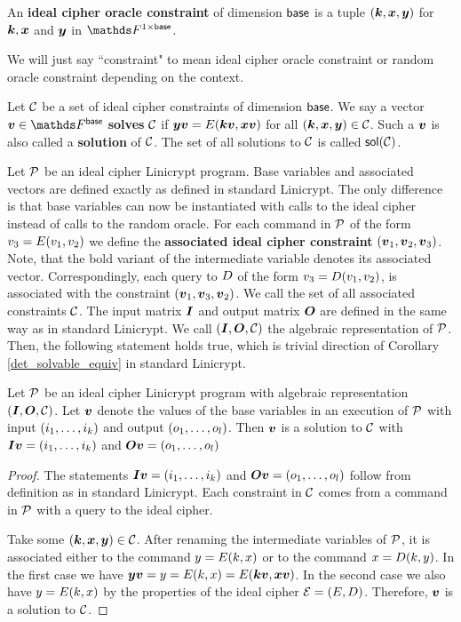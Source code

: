 \begin{defn}
An \textbf{ideal cipher oracle constraint} of dimension $\base$ is a tuple $(\vk, \vx, \vy)$ for
$\vk, \vx$ and $\vy$ in $\F^{1 \times \base}$.
\end{defn}

We will just say ``constraint" to mean ideal cipher oracle constraint or random oracle constraint depending on the context.

\begin{defn}
    Let $\C$ be a set of ideal cipher constraints of dimension $\base$.
    We say a vector $\vv \in \Base$ \textbf{solves} $\C$ if
    $\vy \vv = \E(\vk \vv, \vx \vv)$ for all $(\vk, \vx, \vy) \in \C$.
    Such a $\vv$ is also called a \textbf{solution} of $\C$.
    The set of all solutions to $\C$ is called $\sol(\C)$.
\end{defn}

Let $\P$ be an ideal cipher Linicrypt program.
Base variables and associated vectors are defined exactly as defined in standard Linicrypt.
The only difference is that base variables can now be instantiated with calls to the ideal cipher instead of calls to the random oracle.
For each command in $\P$ of the form $v_3 = \E(v_1,v_2)$
we define the \textbf{associated ideal cipher constraint} $(\vv_1, \vv_2, \vv_3)$.
Note, that the bold variant of the intermediate variable denotes its associated vector.
Correspondingly, each query to $\D$ of the form $v_3 = \D(v_1,v_2)$,
is associated with the constraint $(\vv_1, \vv_3, \vv_2)$.
We call the set of all associated constraints $\C$. 
The input matrix $\I$ and output matrix $\O$ are defined in the same way as in standard Linicrypt.
We call $(\I,\O,\C)$ the algebraic representation of $\P$.
Then, the following statement holds true, which is trivial direction of Corollary \ref{det_solvable_equiv} in standard Linicrypt.

\begin{lemma}
    Let $\P$ be an ideal cipher Linicrypt program with algebraic representation $(\I,\O,\C)$.
    Let $\vv$ denote the values of the base variables in an execution of $\P$ with input $(\dts i k)$ and output $(\dts o l)$.
    Then $\vv$ is a solution to $\C$ with $\I\vv = (\dts i k)$ and $\O\vv = (\dts o l)$
\end{lemma}

\begin{proof}
    The statements $\I\vv = (\dts i k)$ and $\O\vv = (\dts o l)$ follow from definition as in standard Linicrypt.
    Each constraint in $\C$ comes from a command in $\P$ with a query to the ideal cipher.

    Take some $(\vk, \vx, \vy) \in \C$.
    After renaming the intermediate variables of $\P$,
    it is associated either to the command $y = \E(k, x)$ or to the command $x = \D(k, y)$.
    In the first case we have $\vy\vv = y = \E(k, x) = \E(\vk\vv, \vx\vv)$.
    In the second case we also have $y = \E(k,x)$
    by the properties of the ideal cipher $\mathcal{E} = (\E,\D)$.
    Therefore, $\vv$ is a solution to $\C$.
\end{proof}

